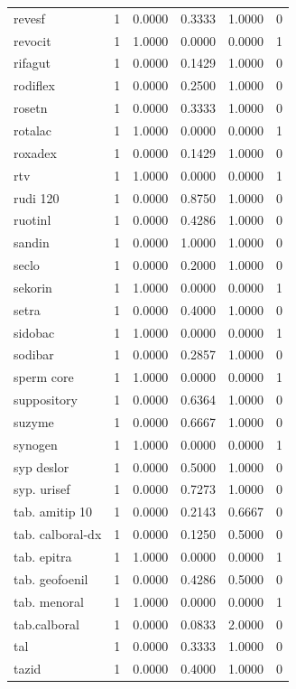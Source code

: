 \begin{longtable}{p{3.0cm}rrrrr}
revesf & 1 & 0.0000 & 0.3333 & 1.0000 & 0 \\
revocit & 1 & 1.0000 & 0.0000 & 0.0000 & 1 \\
rifagut & 1 & 0.0000 & 0.1429 & 1.0000 & 0 \\
rodiflex & 1 & 0.0000 & 0.2500 & 1.0000 & 0 \\
rosetn & 1 & 0.0000 & 0.3333 & 1.0000 & 0 \\
rotalac & 1 & 1.0000 & 0.0000 & 0.0000 & 1 \\
roxadex & 1 & 0.0000 & 0.1429 & 1.0000 & 0 \\
rtv & 1 & 1.0000 & 0.0000 & 0.0000 & 1 \\
rudi 120 & 1 & 0.0000 & 0.8750 & 1.0000 & 0 \\
ruotinl & 1 & 0.0000 & 0.4286 & 1.0000 & 0 \\
sandin & 1 & 0.0000 & 1.0000 & 1.0000 & 0 \\
seclo & 1 & 0.0000 & 0.2000 & 1.0000 & 0 \\
sekorin & 1 & 1.0000 & 0.0000 & 0.0000 & 1 \\
setra & 1 & 0.0000 & 0.4000 & 1.0000 & 0 \\
sidobac & 1 & 1.0000 & 0.0000 & 0.0000 & 1 \\
sodibar & 1 & 0.0000 & 0.2857 & 1.0000 & 0 \\
sperm core & 1 & 1.0000 & 0.0000 & 0.0000 & 1 \\
suppository & 1 & 0.0000 & 0.6364 & 1.0000 & 0 \\
suzyme & 1 & 0.0000 & 0.6667 & 1.0000 & 0 \\
synogen & 1 & 1.0000 & 0.0000 & 0.0000 & 1 \\
syp deslor & 1 & 0.0000 & 0.5000 & 1.0000 & 0 \\
syp. urisef & 1 & 0.0000 & 0.7273 & 1.0000 & 0 \\
tab. amitip 10 & 1 & 0.0000 & 0.2143 & 0.6667 & 0 \\
tab. calboral-dx & 1 & 0.0000 & 0.1250 & 0.5000 & 0 \\
tab. epitra & 1 & 1.0000 & 0.0000 & 0.0000 & 1 \\
tab. geofoenil & 1 & 0.0000 & 0.4286 & 0.5000 & 0 \\
tab. menoral & 1 & 1.0000 & 0.0000 & 0.0000 & 1 \\
tab.calboral & 1 & 0.0000 & 0.0833 & 2.0000 & 0 \\
tal & 1 & 0.0000 & 0.3333 & 1.0000 & 0 \\
tazid & 1 & 0.0000 & 0.4000 & 1.0000 & 0 \\

\end{longtable}
